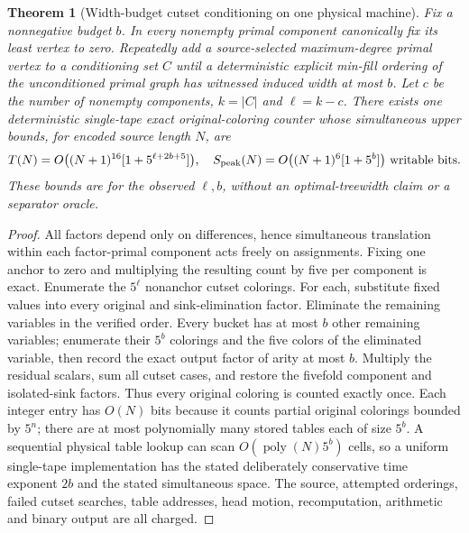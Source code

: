 \documentclass[11pt]{article}
\newtheorem{theorem}{Theorem}
\begin{document}
\begin{theorem}[Width-budget cutset conditioning on one physical machine]
Fix a nonnegative budget $b$. In every nonempty primal
component canonically fix its least vertex to zero.
Repeatedly add a source-selected maximum-degree primal
vertex to a conditioning set $C$ until a deterministic
explicit min-fill ordering of the unconditioned primal graph
has witnessed induced width at most $b$.
Let $c$ be the number of nonempty components,
$k=|C|$ and $\ell=k-c$.
There exists one deterministic single-tape exact original-coloring
counter whose \emph{simultaneous} upper bounds, for encoded
source length $N$, are
\[
T(N)=O\bigl((N+1)^{16}[1+5^{\ell+2b+5}]\bigr),
\quad
S_{\rm peak}(N)=O\bigl((N+1)^6[1+5^b]\bigr)
\text{ writable bits}.
\]
These bounds are for the \emph{observed} $\ell,b$, without
an optimal-treewidth claim or a separator oracle.
\end{theorem}
\begin{proof}
All factors depend only on differences, hence simultaneous
translation within each factor-primal component acts freely
on assignments. Fixing one anchor to zero and multiplying
the resulting count by five per component is exact.
Enumerate the $5^\ell$ nonanchor cutset colorings.
For each, substitute fixed values into every original and
sink-elimination factor. Eliminate the remaining variables
in the verified order. Every bucket has at most $b$
other remaining variables; enumerate their $5^b$ colorings
and the five colors of the eliminated variable, then record
the exact output factor of arity at most $b$.
Multiply the residual scalars, sum all cutset cases,
and restore the fivefold component and isolated-sink factors.
Thus every original coloring is counted exactly once.
Each integer entry has $O(N)$ bits because it counts
partial original colorings bounded by $5^n$; there are
at most polynomially many stored tables each of size
$5^b$. A sequential physical table lookup can scan
$O(\operatorname{poly}(N)5^b)$ cells, so a uniform
single-tape implementation has the stated deliberately
conservative time exponent $2b$ and the stated simultaneous
space. The source, attempted orderings, failed cutset
searches, table addresses, head motion, recomputation,
arithmetic and binary output are all charged.
\end{proof}
\end{document}
